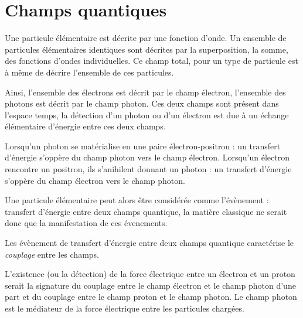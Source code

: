 
\section{Champs quantiques}
%
Une particule élémentaire est décrite par une fonction d'onde. Un ensemble de particules élémentaires identiques sont décrites par la superposition, la somme, des fonctions d'ondes individuelles. Ce champ total, pour un type de particule est à même de décrire l'ensemble de ces particules.

Ainsi, l'ensemble des électrons est décrit par le champ électron, l'ensemble des photons est décrit par le champ photon. Ces deux champs sont présent dans l'espace temps, la détection d'un photon ou d'un électron est due à un échange élémentaire d'énergie entre ces deux champs.

Lorsqu'un photon se matérialise en une paire électron-positron : un transfert d'énergie s'oppère du champ photon vers le champ électron. Lorsqu'un électron rencontre un positron, ils s'anihilent donnant un photon :  un transfert d'énergie s'oppère du champ électron vers le champ photon.

Une particule élémentaire peut alors être considérée comme l'évènement : transfert d'énergie entre deux champs quantique, la matière classique ne serait donc que la manifestation de ces évenements.

Les évènement de transfert d'énergie entre deux champs quantique caractérise le \textsf{\textit {couplage}} entre les champs.

L'existence (ou la détection) de la force électrique entre un électron et un proton serait la signature du couplage entre le champ électron et le champ photon d'une part et du couplage entre le champ proton et le champ photon. Le champ photon est le médiateur de la force électrique entre les particules chargées.
